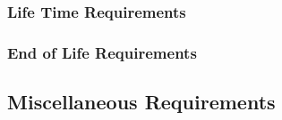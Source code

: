 \documentclass[12pt]{article}
\begin{document}
\subsubsection{Life Time Requirements}
\subsubsection{End of Life Requirements}
\subsection{Miscellaneous Requirements}
\end{document}
